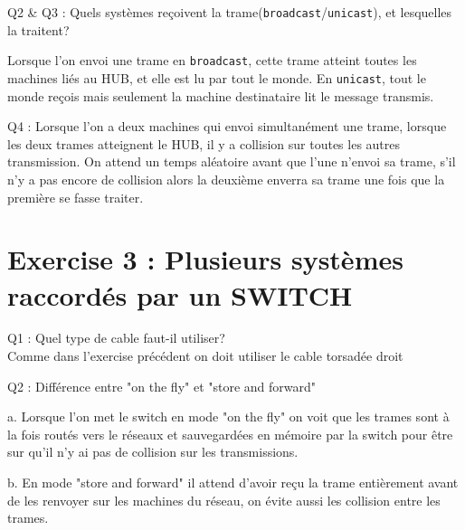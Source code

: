 \documentclass[11pt]{book}
\begin{document}
        \begin{dent}{Q2 \& Q3 :} Quels systèmes reçoivent la trame(\texttt{broadcast}/\texttt{unicast}), et lesquelles la traitent?

            Lorsque l'on envoi une trame en \texttt{broadcast}, cette trame atteint toutes les machines liés au HUB, et elle est lu par tout le monde. En \texttt{unicast}, tout le monde reçois mais seulement la machine destinataire lit le message transmis.     
         \end{dent}
        
        \begin{dent}{Q4 :}
            Lorsque l'on a deux machines qui envoi simultanément une trame, lorsque les deux trames atteignent le HUB, il y a collision sur toutes les autres transmission. On attend un temps aléatoire avant que l'une n'envoi sa trame, s'il n'y a pas encore de collision alors la deuxième enverra sa trame une fois que la première se fasse traiter. 
         \end{dent} 
       

	\newpage

    \section{Exercise 3 : Plusieurs systèmes raccordés par un SWITCH}
        
        \begin{dent}{Q1 :} Quel type de cable faut-il utiliser?\\
            Comme dans l'exercise précédent on doit utiliser le cable torsadée droit
         \end{dent}

        \begin{dent}{Q2 :} Différence entre "on the fly" et "store and forward"
            \begin{enum}{-15pt}{-15pt}
                \item[a.] Lorsque l'on met le switch en mode "on the fly" on voit que les trames sont à la fois routés vers le réseaux et sauvegardées en mémoire par la switch pour être sur qu'il n'y ai pas de collision sur les transmissions.  
                \item[b.] En mode "store and forward" il attend d'avoir reçu la trame entièrement avant de les renvoyer sur les machines du réseau, on évite aussi les collision entre les trames. 
            \end{enum}
         \end{dent}
\end{document}
